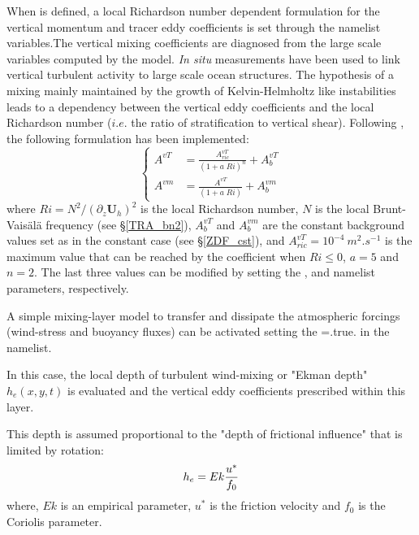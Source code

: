\documentclass[NEMO_book]{subfiles}
\begin{document}
When  is defined, a local Richardson number dependent formulation 
for the vertical momentum and tracer eddy coefficients is set through the   
namelist variables.The vertical mixing 
coefficients are diagnosed from the large scale variables computed by the model. 
\textit{In situ} measurements have been used to link vertical turbulent activity to 
large scale ocean structures. The hypothesis of a mixing mainly maintained by the 
growth of Kelvin-Helmholtz like instabilities leads to a dependency between the 
vertical eddy coefficients and the local Richardson number ($i.e.$ the 
ratio of stratification to vertical shear). Following \citet{Pacanowski_Philander_JPO81}, the following 
formulation has been implemented:
\begin{equation} \label{Eq_zdfric}
   \left\{      \begin{aligned}
         A^{vT} &= \frac {A_{ric}^{vT}}{\left( 1+a \; Ri \right)^n} + A_b^{vT}       \\
         A^{vm} &= \frac{A^{vT}        }{\left( 1+ a \;Ri  \right)   } + A_b^{vm}
   \end{aligned}    \right.
\end{equation}
where $Ri = N^2 / \left(\partial_z \textbf{U}_h \right)^2$ is the local Richardson 
number, $N$ is the local Brunt-Vais\"{a}l\"{a} frequency (see \S\ref{TRA_bn2}), 
$A_b^{vT} $ and $A_b^{vm}$ are the constant background values set as in the 
constant case (see \S\ref{ZDF_cst}), and $A_{ric}^{vT} = 10^{-4}~m^2.s^{-1}$ 
is the maximum value that can be reached by the coefficient when $Ri\leq 0$, 
$a=5$ and $n=2$. The last three values can be modified by setting the 
,  and  namelist parameters, respectively.

A simple mixing-layer model to transfer and dissipate the atmospheric
 forcings (wind-stress and buoyancy fluxes) can be activated setting 
the  =.true. in the namelist.

In this case, the local depth of turbulent wind-mixing or "Ekman depth"
 $h_{e}(x,y,t)$ is evaluated and the vertical eddy coefficients prescribed within this layer.

This depth is assumed proportional to the "depth of frictional influence" that is limited by rotation:
\begin{equation}
         h_{e} = Ek \frac {u^{*}} {f_{0}}  	\\
\end{equation}
where, $Ek$ is an empirical parameter, $u^{*}$ is the friction velocity and $f_{0}$ is the Coriolis 
parameter.
\end{document}
